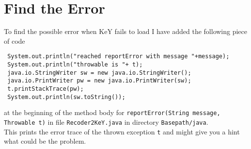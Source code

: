 \documentclass[11pt]{article}
\begin{document}
\section{Find the Error}
To find the possible error when KeY fails to load I have added the following piece of code
\begin{verbatim}
 System.out.println("reached reportError with message "+message); 
 System.out.println("throwable is "+ t); 
 java.io.StringWriter sw = new java.io.StringWriter();
 java.io.PrintWriter pw = new java.io.PrintWriter(sw);
 t.printStackTrace(pw);
 System.out.println(sw.toString());
\end{verbatim}
at the beginning of the method body for 
\verb+reportError(String message, Throwable t)+ in file
\verb+Recoder2KeY.java+ in directory \verb+Basepath/java+.\\
This prints the error trace of the thrown exception \verb+t+ and might
give you a hint what could be the problem.
\end{document}
